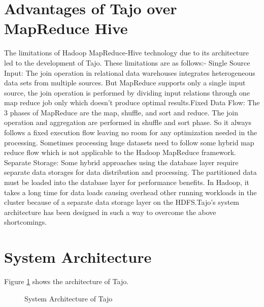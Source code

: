 \documentclass[9pt,twocolumn,twoside]{styles/osajnl}
\begin{document}
\section{Advantages of Tajo over MapReduce Hive}
\cite{tajo-paper} The limitations of Hadoop \cite{mapreduce-article}
\cite{hive-paper} MapReduce-Hive technology due to its architecture
led to the development of Tajo. These limitations are as
follows:- \newline \newline \cite{tajo-paper}Single Source Input: The
join operation in relational data warehouses integrates heterogeneous
data sets from multiple sources. But MapReduce supports only a single
input source, the join operation is performed by dividing input
relations through one map reduce job only which doesn't produce
optimal results.\newline \newline \cite{tajo-paper}Fixed Data Flow:
The 3 phases of MapReduce are the map, shuffle, and sort and
reduce. The join operation and aggregation are performed in shuffle
and sort phase. So it always follows a fixed execution flow leaving no
room for any optimization needed in the processing. Sometimes
processing huge datasets need to follow some hybrid map reduce flow
which is not applicable to the Hadoop MapReduce
framework. \newline \newline \cite{tajo-paper}Separate Storage: Some
hybrid approaches using the database layer require separate data
storages for data distribution and processing. The partitioned data
must be loaded into the database layer for performance benefits. In
Hadoop, it takes a long time for data loads causing overhead other
running workloads in the cluster because of a separate data storage
layer on the HDFS.\newline \newline Tajo's system architecture has
been designed in such a way to overcome the above shortcomings.


\section{System Architecture}

Figure \ref{fig:architecture} shows the architecture of Tajo. 

\begin{figure}[htbp]
\centering
{}
\caption{\cite{tajo-paper} System Architecture of Tajo}
\label{fig:architecture}
\end{figure}
\end{document}
